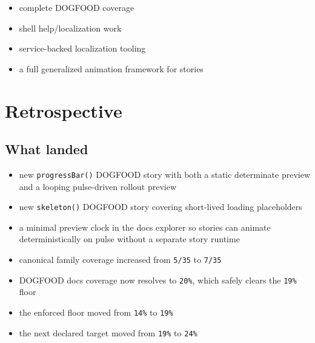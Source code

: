 \begin{itemize}
\tightlist
\item
  complete DOGFOOD coverage
\item
  shell help/localization work
\item
  service-backed localization tooling
\item
  a full generalized animation framework for stories
\end{itemize}

\section{Retrospective}\label{record-067-retrospective}

\subsection{What landed}\label{record-067-what-landed}

\begin{itemize}
\tightlist
\item
  new \texttt{p\allowbreak{}r\allowbreak{}o\allowbreak{}g\allowbreak{}r\allowbreak{}e\allowbreak{}s\allowbreak{}s\allowbreak{}B\allowbreak{}a\allowbreak{}r\allowbreak{}(\allowbreak{})} DOGFOOD story with both a static determinate preview and a looping pulse-driven rollout preview
\item
  new \texttt{s\allowbreak{}k\allowbreak{}e\allowbreak{}l\allowbreak{}e\allowbreak{}t\allowbreak{}o\allowbreak{}n\allowbreak{}(\allowbreak{})} DOGFOOD story covering short-lived loading placeholders
\item
  a minimal preview clock in the docs explorer so stories can animate deterministically on pulse without a separate story runtime
\item
  canonical family coverage increased from \texttt{5\allowbreak{}/\allowbreak{}3\allowbreak{}5} to \texttt{7\allowbreak{}/\allowbreak{}3\allowbreak{}5}
\item
  DOGFOOD docs coverage now resolves to \texttt{2\allowbreak{}0\allowbreak{}\%}, which safely clears the \texttt{1\allowbreak{}9\allowbreak{}\%} floor
\item
  the enforced floor moved from \texttt{1\allowbreak{}4\allowbreak{}\%} to \texttt{1\allowbreak{}9\allowbreak{}\%}
\item
  the next declared target moved from \texttt{1\allowbreak{}9\allowbreak{}\%} to \texttt{2\allowbreak{}4\allowbreak{}\%}
\end{itemize}

